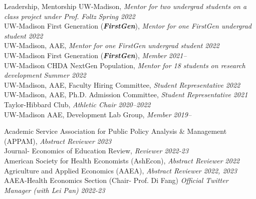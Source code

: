 \documentclass{resume} %
\begin{document}
\begin{rSection}{Leadership, Mentorship}%
UW-Madison, \textit{Mentor for two undergrad students on a class project under Prof. Foltz} {\hfill\textit{Spring 2022}}\\ 
UW-Madison First Generation (\textbf{\textit{FirstGen}}), \textit{Mentor for one FirstGen undergrad student} {\hfill\textit{2022}}\\
UW-Madison, AAE, \textit{Mentor for one FirstGen undergrad student} {\hfill\textit{2022}}\\
UW-Madison First Generation (\textbf{\textit{FirstGen}}), \textit{Member} {\hfill\textit{ 2021--}}\\
UW-Madison CHDA NextGen Population, \textit{Mentor for 18 students on research development} {\hfill\textit{ Summer 2022}}\\
UW-Madison, AAE, Faculty Hiring Committee, \textit{Student Representative} {\hfill \textit{2022}}\\
UW-Madison, AAE, Ph.D. Admission Committee, \textit{Student Representative} {\hfill \textit{2021}}\\
Taylor-Hibbard Club, \textit{Athletic Chair} {\hfill \textit{2020--2022}} \\
UW-Madison AAE, Development Lab Group, \textit{Member} {\hfill \textit{2019--}}
\end{rSection}



\begin{rSection}{Academic Service}%
Association for Public Policy Analysis \& Management (APPAM),  \textit{Abstract Reviewer}  {\hfill \em 2023} \\
Journal- Economics of Education Review, \textit{Reviewer} {\hfill\textit{2022-23}} \\ 
American Society for Health Economists (AshEcon), \textit{Abstract Reviewer} {\hfill\textit{2022}} \\ 
Agriculture and Applied Economics (AAEA), \textit{Abstract Reviewer} {\hfill \textit{2022, 2023}}\\
AAEA-Health Economics Section (Chair- Prof. Di Fang) \textit{Official Twitter Manager (with Lei Pan)} {\hfill \textit{2022-23}}  
\end{rSection}
\end{document}
